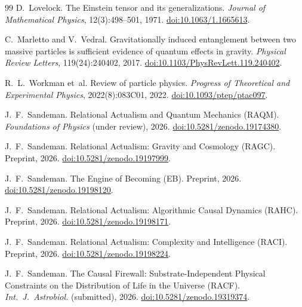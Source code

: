 \documentclass[11pt,a4paper]{article}
\begin{document}
\begin{thebibliography}{99}
D.~Lovelock.
\newblock The Einstein tensor and its generalizations.
\newblock \emph{Journal of Mathematical Physics}, 12(3):498--501, 1971.
\newblock \href{https://doi.org/10.1063/1.1665613}{doi:10.1063/1.1665613}.

C.~Marletto and V.~Vedral.
\newblock Gravitationally induced entanglement between two massive particles
  is sufficient evidence of quantum effects in gravity.
\newblock \emph{Physical Review Letters}, 119(24):240402, 2017.
\newblock \href{https://doi.org/10.1103/PhysRevLett.119.240402}%
  {doi:10.1103/PhysRevLett.119.240402}.

R.~L.~Workman et~al.
\newblock Review of particle physics.
\newblock \emph{Progress of Theoretical and Experimental Physics},
  2022(8):083C01, 2022.
\newblock \href{https://doi.org/10.1093/ptep/ptac097}{doi:10.1093/ptep/ptac097}.

J.~F.~Sandeman.
\newblock Relational Actualism and Quantum Mechanics (RAQM).
\newblock \emph{Foundations of Physics} (under review), 2026.
\newblock \href{https://doi.org/10.5281/zenodo.19174380}%
  {doi:10.5281/zenodo.19174380}.

J.~F.~Sandeman.
\newblock Relational Actualism: Gravity and Cosmology (RAGC).
\newblock Preprint, 2026.
\newblock \href{https://doi.org/10.5281/zenodo.19197999}%
  {doi:10.5281/zenodo.19197999}.

J.~F.~Sandeman.
\newblock The Engine of Becoming (EB).
\newblock Preprint, 2026.
\newblock \href{https://doi.org/10.5281/zenodo.19198120}%
  {doi:10.5281/zenodo.19198120}.

J.~F.~Sandeman.
\newblock Relational Actualism: Algorithmic Causal Dynamics (RAHC).
\newblock Preprint, 2026.
\newblock \href{https://doi.org/10.5281/zenodo.19198171}%
  {doi:10.5281/zenodo.19198171}.

J.~F.~Sandeman.
\newblock Relational Actualism: Complexity and Intelligence (RACI).
\newblock Preprint, 2026.
\newblock \href{https://doi.org/10.5281/zenodo.19198224}%
  {doi:10.5281/zenodo.19198224}.

J.~F.~Sandeman.
\newblock The Causal Firewall: Substrate-Independent Physical Constraints
  on the Distribution of Life in the Universe (RACF).
\newblock \textit{Int.\ J.\ Astrobiol.} (submitted), 2026.
\newblock \href{https://doi.org/10.5281/zenodo.19319374}{doi:10.5281/zenodo.19319374}.


\end{thebibliography}
\end{document}
